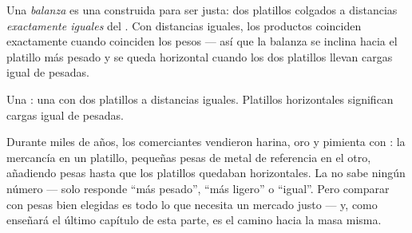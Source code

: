 \begin{definition}[La balanza]\label{def:g3:levers-and-scales:scale}
Una \emph{balanza} es una  construida para ser
justa: dos platillos colgados a distancias \emph{exactamente iguales}
del . Con distancias iguales, los productos coinciden
exactamente cuando coinciden los pesos --- así que la balanza se
inclina hacia el platillo más pesado y se queda horizontal cuando los
dos platillos llevan cargas igual de pesadas.
\end{definition}

\begin{omfigure}

{\small Una : una  con dos platillos a distancias
iguales. Platillos horizontales significan cargas igual de pesadas.}
\end{omfigure}

\begin{example}\label{ex:g3:levers-and-scales:weighing}
Durante miles de años, los comerciantes vendieron harina, oro y
pimienta con : la mercancía en un platillo, pequeñas pesas
de metal de referencia en el otro, añadiendo pesas hasta que los
platillos quedaban horizontales. La  no sabe ningún número ---
solo responde ``más pesado'', ``más ligero'' o ``igual''. Pero
comparar con pesas bien elegidas es todo lo que necesita un mercado
justo --- y, como enseñará el último capítulo de esta parte, es el
camino hacia  la masa misma.
\end{example}


